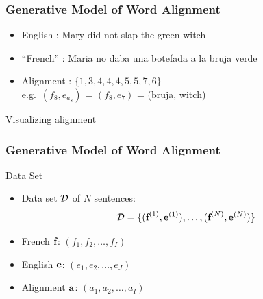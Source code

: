 \begin{frame}
\frametitle{Generative Model of Word Alignment}
\begin{block}{}
\begin{itemize}
\item English \tgt: Mary did not slap the green witch
\item ``French'' \src: Maria no daba una botefada a la bruja verde
\item Alignment \aln: $\{ 1, 3, 4, 4, 4, 5, 5, 7, 6 \}$ \\
e.g.\ $(f_8, e_{a_8})$ = $(f_8, e_7)$ = (bruja, witch)
\end{itemize}
\end{block}\pause
\begin{block}{Visualizing alignment \aln}

\end{block}
\end{frame}

\begin{frame}
\frametitle{Generative Model of Word Alignment}
\begin{block}{Data Set}
\begin{itemize}[<+->]
\item Data set ${\cal D}$ of $N$ sentences:
\[ {\cal D} = \{ (\textbf{f}^{(1)}, \textbf{e}^{(1)}), \ldots, (\textbf{f}^{(N)}, \textbf{e}^{(N)}) \} \]
\item French $\textbf{f}$: $( f_1, f_2, \ldots, f_I )$
\item English $\textbf{e}$: $( e_1, e_2, \ldots, e_J )$
\item Alignment $\textbf{a}$: $( a_1, a_2, \ldots, a_I )$
\end{itemize}
\end{block}
\end{frame}

